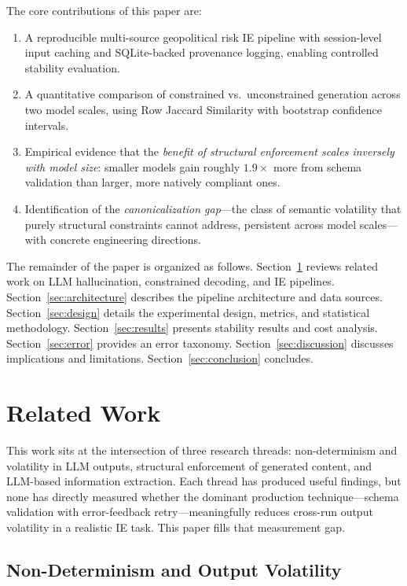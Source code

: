 \documentclass[sigconf]{acmart}
\begin{document}
The core contributions of this paper are:
\begin{enumerate}
  \item A reproducible multi-source geopolitical risk IE pipeline with session-level input caching and SQLite-backed provenance logging, enabling controlled stability evaluation.
  \item A quantitative comparison of constrained vs.\ unconstrained generation across two model scales, using Row Jaccard Similarity with bootstrap confidence intervals.
  \item Empirical evidence that the \emph{benefit of structural enforcement scales inversely with model size}: smaller models gain roughly $1.9\times$ more from schema validation than larger, more natively compliant ones.
  \item Identification of the \emph{canonicalization gap}---the class of semantic volatility that purely structural constraints cannot address, persistent across model scales---with concrete engineering directions.
\end{enumerate}
The remainder of the paper is organized as follows. Section~\ref{sec:related} reviews related work on LLM hallucination, constrained decoding, and IE pipelines. Section~\ref{sec:architecture} describes the pipeline architecture and data sources. Section~\ref{sec:design} details the experimental design, metrics, and statistical methodology. Section~\ref{sec:results} presents stability results and cost analysis. Section~\ref{sec:error} provides an error taxonomy. Section~\ref{sec:discussion} discusses implications and limitations. Section~\ref{sec:conclusion} concludes.

\section{Related Work}
\label{sec:related}

This work sits at the intersection of three research threads: non-determinism and volatility in LLM outputs, structural enforcement of generated content, and LLM-based information extraction. Each thread has produced useful findings, but none has directly measured whether the dominant production technique---schema validation with error-feedback retry---meaningfully reduces cross-run output volatility in a realistic IE task. This paper fills that measurement gap.

\subsection{Non-Determinism and Output Volatility}
\end{document}
